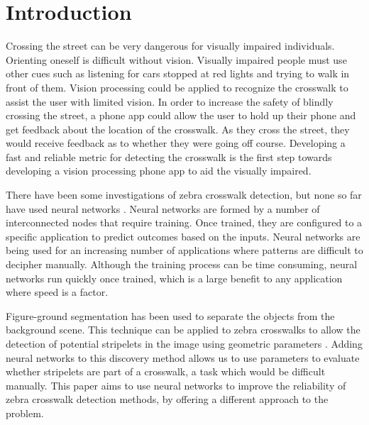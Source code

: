 \documentclass[12pt]{ucthesis}
\begin{document}
\pagestyle{plain}

\renewcommand{\baselinestretch}{1.66}


\chapter{Introduction}
\label{intro}

Crossing the street can be very dangerous for visually impaired individuals. Orienting oneself is difficult without vision. Visually impaired people must use other cues such as listening for cars stopped at red lights and trying to walk in front of them. Vision processing could be applied to recognize the crosswalk to assist the user with limited vision. In order to increase the safety of blindly crossing the street, a phone app could allow the user to hold up their phone and get feedback about the location of the crosswalk. As they cross the street, they would receive feedback as to whether they were going off course. Developing a fast and reliable metric for detecting the crosswalk is the first step towards developing a vision processing phone app to aid the visually impaired.

There have been some investigations of zebra crosswalk detection, but none so far have used neural networks \cite{Coughlan2006}\cite{ZebraPhone}. Neural networks are formed by a number of interconnected nodes that require training. Once trained, they are configured to a specific application to predict outcomes based on the inputs. Neural networks are being used for an increasing number of applications where patterns are difficult to decipher manually. Although the training process can be time consuming, neural networks run quickly once trained, which is a large benefit to any application where speed is a factor. 

Figure-ground segmentation has been used to separate the objects from the background scene. This technique can be applied to zebra crosswalks to allow the detection of potential stripelets in the image using geometric parameters \cite{Coughlan2006}. Adding neural networks to this discovery method allows us to use parameters to evaluate whether stripelets are part of a crosswalk, a task which would be difficult manually. This paper aims to use neural networks to improve the reliability of zebra crosswalk detection methods, by offering a different approach to the problem.

\end{document}
